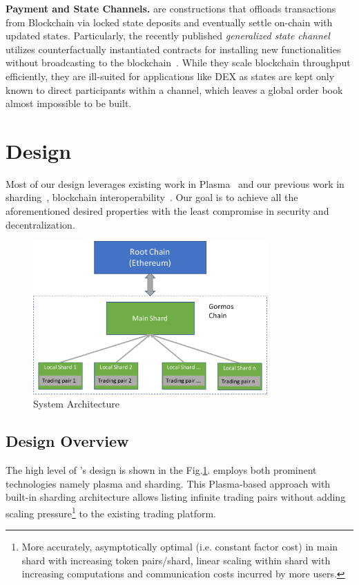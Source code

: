 \textbf{Payment and State Channels.}\cite{lightning, miller2017sprites} are constructions that offloads transactions from Blockchain via locked state deposits and eventually settle on-chain with updated states. Particularly, the recently published \textit{generalized state channel} utilizes counterfactually instantiated contracts for installing new functionalities without broadcasting to the blockchain~\cite{Coleman2018, Dziembowski2018}. While they scale blockchain throughput efficiently, they are ill-suited for applications like DEX as states are kept only known to direct participants within a channel, which leaves a global order book almost impossible to be built.

\section{Design}

Most of our design leverages existing work in Plasma~\cite{plasma} and our previous work in sharding~\cite{elastico}, blockchain interoperability~\cite{peacerelay}. Our goal is to achieve all the aforementioned desired properties with the least compromise in security and decentralization.

\begin{figure}[t]
  \centering
  \includegraphics[width=0.8\textwidth]{images/architecture}
  \caption{\codename System Architecture}
  \label{architecture}
\end{figure}


\subsection{Design Overview}
The high level of \codename's design is shown in the Fig.\ref{architecture}. \codename employs both prominent technologies namely plasma and sharding. This Plasma-based approach with built-in sharding architecture allows listing infinite trading pairs without adding scaling pressure\footnote{More accurately, asymptotically optimal (i.e. constant factor cost) in main shard with increasing token pairs/shard, linear scaling within shard with increasing computations and communication costs incurred by more users.} to the existing trading platform.

